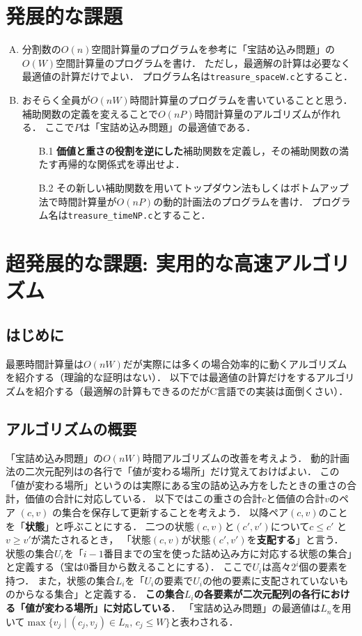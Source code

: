 \documentclass[a4paper,twoside,onecolumn,openany,article]{memoir}
\theoremstyle{remark}
\begin{document}
\section{発展的な課題}
\begin{enumerate}[A.]
\item 分割数の$O(n)$空間計算量のプログラムを参考に「宝詰め込み問題」の$O(W)$空間計算量のプログラムを書け．
ただし，最適解の計算は必要なく最適値の計算だけでよい．
プログラム名は\texttt{treasure\_spaceW.c}とすること．
\item おそらく全員が$O(nW)$時間計算量のプログラムを書いていることと思う．
補助関数の定義を変えることで$O(nP)$時間計算量のアルゴリズムが作れる．
ここで$P$は「宝詰め込み問題」の最適値である．
\begin{enumerate}
\item[B.1] \textbf{価値と重さの役割を逆にした}補助関数を定義し，その補助関数の満たす再帰的な関係式を導出せよ．
\item[B.2] その新しい補助関数を用いてトップダウン法もしくはボトムアップ法で時間計算量が$O(nP)$の動的計画法のプログラムを書け．
プログラム名は\texttt{treasure\_timeNP.c}とすること．
\end{enumerate}
\end{enumerate}

\section{超発展的な課題: 実用的な高速アルゴリズム}
\subsection{はじめに}
最悪時間計算量は$O(nW)$だが実際には多くの場合効率的に動くアルゴリズムを紹介する（理論的な証明はない）．
以下では最適値の計算だけをするアルゴリズムを紹介する（最適解の計算もできるのだがC言語での実装は面倒くさい）．

\subsection{アルゴリズムの概要}
「宝詰め込み問題」の$O(nW)$時間アルゴリズムの改善を考えよう．
動的計画法の二次元配列はの各行で「値が変わる場所」だけ覚えておけばよい．
この「値が変わる場所」というのは実際にある宝の詰め込み方をしたときの重さの合計，価値の合計に対応している．
以下ではこの重さの合計$c$と価値の合計$v$のペア $(c, v)$ の集合を保存して更新することを考えよう．
以降ペア$(c,v)$のことを「\textbf{状態}」と呼ぶことにする．
二つの状態$(c, v)$と$(c',v')$について$c\le c'$ と $v\ge v'$が満たされるとき，
「状態$(c,v)$が状態$(c',v')$を\textbf{支配する}」と言う．
状態の集合$U_i$を「$i-1$番目までの宝を使った詰め込み方に対応する状態の集合」と定義する（宝は0番目から数えることにする）．
ここで$U_i$は高々$2^{i}$個の要素を持つ．
また，状態の集合$L_i$を「$U_i$の要素で$U_i$の他の要素に支配されていないものからなる集合」と定義する．
\textbf{この集合$L_i$の各要素が二次元配列の各行における「値が変わる場所」に対応している}．
「宝詰め込み問題」の最適値は$L_n$を用いて$\max \{ v_j\mid (c_j,v_j)\in L_n,\, c_j\le W\}$と表わされる．
\end{document}
